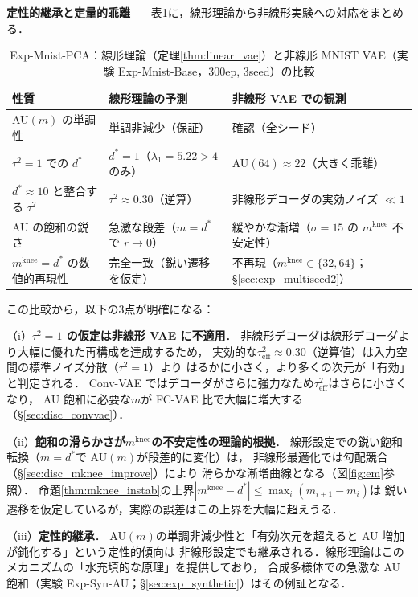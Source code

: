 \documentclass[11pt,a4paper]{jsarticle}
\newcommand{\mknee}{m^{\mathrm{knee}}}
\begin{document}
\textbf{定性的継承と定量的乖離}~~~
表\ref{tab:theory_inherit}に，線形理論から非線形実験への対応をまとめる．

\begin{table}[H]
\centering
\caption{Exp-Mnist-PCA：線形理論（定理\ref{thm:linear_vae}）と非線形 MNIST VAE（実験 Exp-Mnist-Base，300ep, 3seed）の比較}
\label{tab:theory_inherit}
\small
\begin{tabular}{lll}
\toprule
性質 & 線形理論の予測 & 非線形 VAE での観測 \\
\midrule
AU$(m)$ の単調性 & 単調非減少（保証） & 確認（全シード） \\
$\tau^2=1$ での $d^*$ & $d^*=1$（$\lambda_1=5.22>4$ のみ） & AU$(64) \approx 22$（大きく乖離） \\
$d^* \approx 10$ と整合する $\tau^2$ & $\tau^2 \approx 0.30$（逆算） & 非線形デコーダの実効ノイズ $\ll 1$ \\
AU の飽和の鋭さ & 急激な段差（$m=d^*$ で $r\to 0$） & 緩やかな漸増（$\sigma=15$ の $\mknee$ 不安定性） \\
$\mknee = d^*$ の数値的再現性 & 完全一致（鋭い遷移を仮定） & 不再現（$\mknee \in \{32,64\}$；§\ref{sec:exp_multiseed2}） \\
\bottomrule
\end{tabular}
\end{table}

この比較から，以下の3点が明確になる：

（i）\textbf{$\tau^2 = 1$ の仮定は非線形 VAE に不適用}．
非線形デコーダは線形デコーダより大幅に優れた再構成を達成するため，
実効的な$\tau^2_{\mathrm{eff}} \approx 0.30$（逆算値）は入力空間の標準ノイズ分散（$\tau^2=1$）より
はるかに小さく，より多くの次元が「有効」と判定される．
Conv-VAE ではデコーダがさらに強力なため$\tau^2_\mathrm{eff}$はさらに小さくなり，
AU 飽和に必要な$m$が FC-VAE 比で大幅に増大する（§\ref{sec:disc_convvae}）．

（ii）\textbf{飽和の滑らかさが$\mknee$の不安定性の理論的根拠}．
線形設定での鋭い飽和転換（$m=d^*$で AU$(m)$が段差的に変化）は，
非線形最適化では勾配競合（§\ref{sec:disc_mknee_improve}）により
滑らかな漸増曲線となる（図\ref{fig:em}参照）．
命題\ref{thm:mknee_instab}の上界$|\mknee - d^*| \leq \max_i(m_{i+1}-m_i)$は
鋭い遷移を仮定しているが，実際の誤差はこの上界を大幅に超えうる．

（iii）\textbf{定性的継承}．
AU$(m)$の単調非減少性と「有効次元を超えると AU 増加が鈍化する」という定性的傾向は
非線形設定でも継承される．線形理論はこのメカニズムの「水充填的な原理」を提供しており，
合成多様体での急激な AU 飽和（実験 Exp-Syn-AU；§\ref{sec:exp_synthetic}）はその例証となる．
\end{document}
